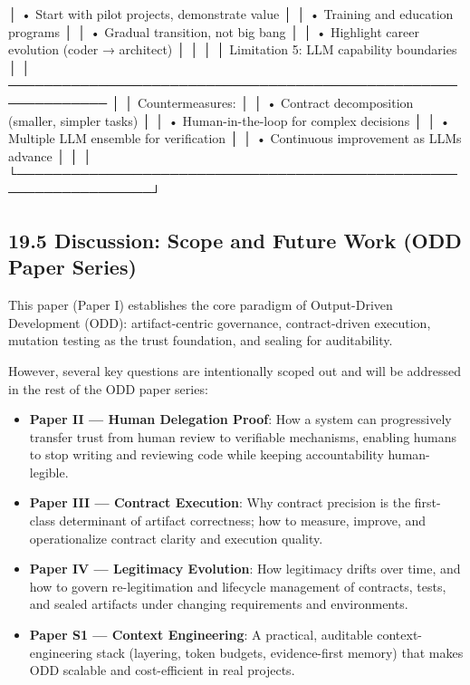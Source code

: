 \documentclass[
]{article}
\newenvironment{Shaded}{}{}
\newcommand{\NormalTok}[1]{#1}
\begin{document}
\begin{Shaded}
\begin{Highlighting}[]
\NormalTok{│  • Start with pilot projects, demonstrate value                 │}
\NormalTok{│  • Training and education programs                              │}
\NormalTok{│  • Gradual transition, not big bang                             │}
\NormalTok{│  • Highlight career evolution (coder → architect)               │}
\NormalTok{│                                                                  │}
\NormalTok{│  Limitation 5: LLM capability boundaries                        │}
\NormalTok{│  ─────────────────────────────────────────────────────────────  │}
\NormalTok{│  Countermeasures:                                               │}
\NormalTok{│  • Contract decomposition (smaller, simpler tasks)              │}
\NormalTok{│  • Human{-}in{-}the{-}loop for complex decisions                      │}
\NormalTok{│  • Multiple LLM ensemble for verification                       │}
\NormalTok{│  • Continuous improvement as LLMs advance                       │}
\NormalTok{│                                                                  │}
\NormalTok{└─────────────────────────────────────────────────────────────────┘}
\end{Highlighting}
\end{Shaded}

\hypertarget{195-discussion-scope-and-future-work-odd-paper-series}{%
\subsection{19.5 Discussion: Scope and Future Work (ODD Paper
Series)}\label{195-discussion-scope-and-future-work-odd-paper-series}}

This paper (Paper I) establishes the core paradigm of Output-Driven
Development (ODD): artifact-centric governance, contract-driven
execution, mutation testing as the trust foundation, and sealing for
auditability.

However, several key questions are intentionally scoped out and will be
addressed in the rest of the ODD paper series:

\begin{itemize}
\item
  \textbf{Paper II --- Human Delegation Proof}: How a system can
  progressively transfer trust from human review to verifiable
  mechanisms, enabling humans to stop writing and reviewing code while
  keeping accountability human-legible.
\item
  \textbf{Paper III --- Contract Execution}: Why contract precision is
  the first-class determinant of artifact correctness; how to measure,
  improve, and operationalize contract clarity and execution quality.
\item
  \textbf{Paper IV --- Legitimacy Evolution}: How legitimacy drifts over
  time, and how to govern re-legitimation and lifecycle management of
  contracts, tests, and sealed artifacts under changing requirements and
  environments.
\item
  \textbf{Paper S1 --- Context Engineering}: A practical, auditable
  context-engineering stack (layering, token budgets, evidence-first
  memory) that makes ODD scalable and cost-efficient in real projects.
\end{itemize}
\end{document}
